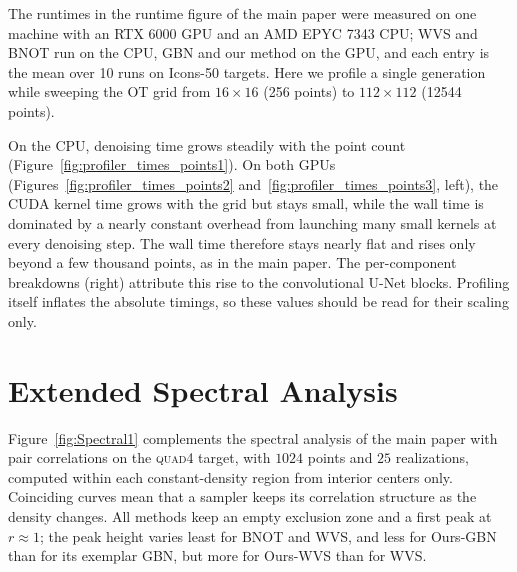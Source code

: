\documentclass{egpubl}
\begin{document}


The runtimes in the runtime figure of the main paper were measured on one machine with an RTX 6000 GPU and an AMD EPYC 7343 CPU; WVS and BNOT run on the CPU, GBN and our method on the GPU, and each entry is the mean over 10 runs on Icons-50 targets. Here we profile a single generation while sweeping the OT grid from $16\times16$ (256 points) to $112\times112$ (12544 points).

On the CPU, denoising time grows steadily with the point count (Figure~\ref{fig:profiler_times_points1}). On both GPUs (Figures~\ref{fig:profiler_times_points2} and~\ref{fig:profiler_times_points3}, left), the CUDA kernel time grows with the grid but stays small, while the wall time is dominated by a nearly constant overhead from launching many small kernels at every denoising step. The wall time therefore stays nearly flat and rises only beyond a few thousand points, as in the main paper. The per-component breakdowns (right) attribute this rise to the convolutional U-Net blocks. Profiling itself inflates the absolute timings, so these values should be read for their scaling only.

\section{Extended Spectral Analysis}

Figure~\ref{fig:Spectral1} complements the spectral analysis of the main paper with pair correlations on the \textsc{quad4} target, with $1024$ points and $25$ realizations, computed within each constant-density region from interior centers only. Coinciding curves mean that a sampler keeps its correlation structure as the density changes. All methods keep an empty exclusion zone and a first peak at $r \approx 1$; the peak height varies least for BNOT and WVS, and less for Ours-GBN than for its exemplar GBN, but more for Ours-WVS than for WVS.
\end{document}
